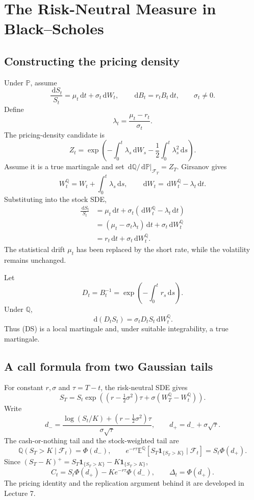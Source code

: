 \documentclass[10pt]{article}
\newcommand{\E}{\mathbb E}
\newcommand{\Pp}{\mathbb P}
\newcommand{\Q}{\mathbb Q}
\newcommand{\1}{\mathbf 1}
\newcommand{\cF}{\mathcal F}
\newcommand{\dd}{\,\mathrm d}
\theoremstyle{definition}
\begin{document}
\section{The Risk-Neutral Measure in Black--Scholes}

\subsection{Constructing the pricing density}

Under \(\Pp\), assume
\[
\frac{\dd S_t}{S_t}=\mu_t\dd t+\sigma_t\dd W_t,
\qquad
\dd B_t=r_tB_t\dd t,
\qquad \sigma_t\neq0.
\]
Define
\[
\lambda_t=\frac{\mu_t-r_t}{\sigma_t}.
\]
The pricing-density candidate is
\[
\boxed{
Z_t=\exp\!\left(
-\int_0^t\lambda_s\dd W_s
-\frac12\int_0^t\lambda_s^2\dd s
\right).}
\]
Assume it is a true martingale and set
\(\dd\Q/\dd\Pp|_{\cF_T}=Z_T\). Girsanov gives
\[
\boxed{
W_t^{\Q}=W_t+\int_0^t\lambda_s\dd s,
\qquad
\dd W_t=\dd W_t^{\Q}-\lambda_t\dd t.}
\]
Substituting into the stock SDE,
\[
\begin{aligned}
\frac{\dd S_t}{S_t}
&=\mu_t\dd t+\sigma_t
  (\dd W_t^{\Q}-\lambda_t\dd t)\\
&=(\mu_t-\sigma_t\lambda_t)\dd t
  +\sigma_t\dd W_t^{\Q}\\
&=\boxed{r_t\dd t+\sigma_t\dd W_t^{\Q}.}
\end{aligned}
\]
The statistical drift \(\mu_t\) has been replaced by the short rate, while
the volatility remains unchanged.

Let
\[
D_t=B_t^{-1}=\exp\!\left(-\int_0^tr_s\dd s\right).
\]
Under \(\Q\),
\[
\boxed{
\dd(D_tS_t)=\sigma_tD_tS_t\dd W_t^{\Q}.}
\]
Thus (DS) is a local martingale and, under suitable integrability, a true
martingale.

\subsection{A call formula from two Gaussian tails}

For constant \(r,\sigma\) and \(\tau=T-t\), the risk-neutral SDE gives
\[
S_T=S_t\exp\!\left((r-\tfrac12\sigma^2)\tau
+\sigma(W_T^{\Q}-W_t^{\Q})\right).
\]
Write
\[
d_-=\frac{\log(S_t/K)+(r-\frac12\sigma^2)\tau}
          {\sigma\sqrt\tau},\qquad
d_+=d_-+\sigma\sqrt\tau.
\]
The cash-or-nothing tail and the stock-weighted tail are
\[
\Q(S_T>K\mid\cF_t)=\Phi(d_-),\qquad
e^{-r\tau}\E^{\Q}[S_T\1_{\{S_T>K\}}\mid\cF_t]
=S_t\Phi(d_+).
\]
Since \((S_T-K)^+=S_T\1_{\{S_T>K\}}-K\1_{\{S_T>K\}}\),
\[
\boxed{C_t=S_t\Phi(d_+)-Ke^{-r\tau}\Phi(d_-),\qquad
\Delta_t=\Phi(d_+).}
\]
The pricing identity and the replication argument behind it are developed
in Lecture 7.
\end{document}
